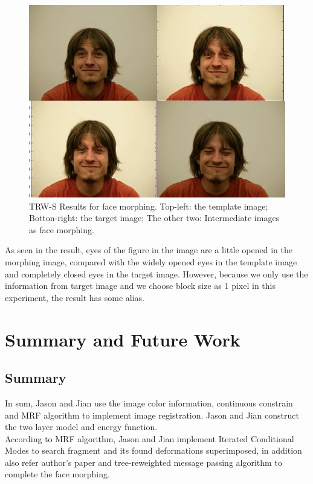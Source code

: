 \documentclass{article} %
\begin{document}
        \begin{figure}[!ht]
        \centering
        \includegraphics[scale=0.5]{faceMorph.jpg}
        \caption{TRW-S Results for face morphing. Top-left: the template image; Botton-right: the target image; The other two: Intermediate images as face morphing.}
        \end{figure}
        As seen in the result, eyes of the figure in the image are a little opened in the morphing image, compared with the widely opened eyes in the template image and completely closed eyes in the target image. However, because we only use the information from target image and we choose block size as 1 pixel in this experiment, the result has some alias.
\section{Summary and Future Work}
\subsection{Summary}
        In sum, Jason and Jian use the image color information, continuous constrain and MRF algorithm to implement image registration. Jason and Jian construct the two layer model and energy function.\\
        According to MRF algorithm, Jason and Jian implement Iterated Conditional Modes to search fragment and its found deformations superimposed, in addition  also refer author's paper and tree-reweighted message passing algorithm to complete the face morphing. \\
\end{document}
